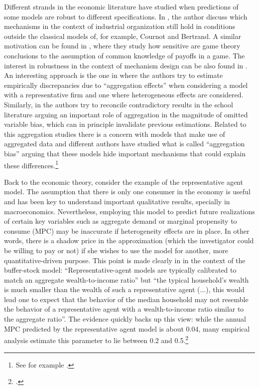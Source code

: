\documentclass[english, a4paper,12pt]{article}
\begin{document}
Different strands in the economic literature have studied when predictions of some models are robust to different specifications. In \cite{SuttonMarketStruct}, the author discuss which mechanisms in the context of industrial organization still hold in conditions outside the classical models of, for example, Cournot and Bertrand. A similar motivation can be found in \cite{Morris97}, where they study how sensitive are game theory conclusions to the assumption of common knowledge of payoffs in a game. The interest in robustness in the context of mechanism design can be also found in \cite{Morris2011}. An interesting approach is the one in \cite{Basu97} where the authors try to estimate empirically discrepancies due to ``aggregation effects'' when considering a model with a representative firm and one where heterogeneous effects are considered. Similarly, in \cite{SchoolAggregation} the authors try to reconcile contradictory results in the school literature arguing an important role of aggregation in the magnitude of omitted variable bias, which can in principle invalidate previous estimations. Related to this aggregation studies there is a concern with models that make use of aggregated data and different authors have studied what is called ``aggregation bias'' arguing that these models hide important mechanisms that could explain these differences.\footnote{See for example \cite{Agg1, Agg2, Agg3, Agg4}.}  

Back to the economic theory, consider the example of the representative agent model. The assumption that there is only one consumer in the economy is useful and has been key to understand important qualitative results, specially in macroeconomics. Nevertheless, employing this model to predict future realizations of certain key variables such as aggregate demand or marginal propensity to consume (MPC) may be inaccurate if heterogeneity effects are in place. In other words, there is a shadow price in the approximation (which the investigator could be willing to pay or not) if she wishes to use the model for another, more quantitative-driven purpose. This point is made clearly in \cite{CarrollRequiem} in the context of the buffer-stock model: ``Representative-agent models are typically calibrated to match an aggregate wealth-to-income ratio'' but ``the typical household’s wealth is much smaller than the wealth of such a representative agent (...), this would lead one to expect that the behavior of the median household may not resemble the behavior of a representative agent with a wealth-to-income ratio similar to the aggregate ratio''. The evidence quickly backs up this view: while the annual MPC predicted by the representative agent model is about 0.04, many empirical analysis estimate this parameter to lie between 0.2 and 0.5.\footnote{\cite{CarrollRequiem}.} 
\end{document}
